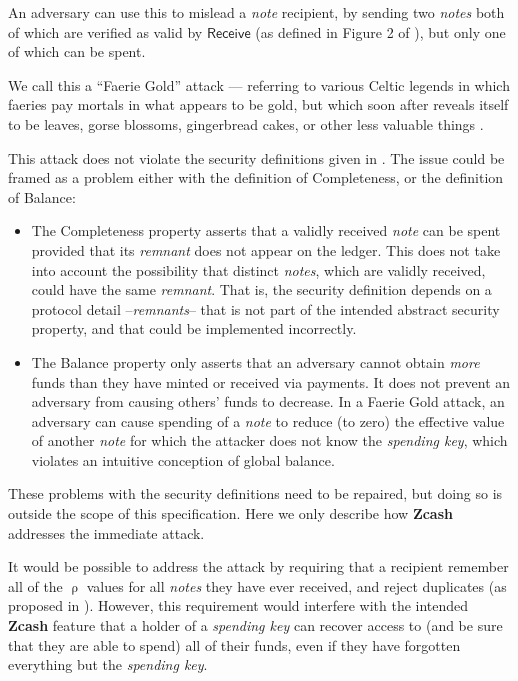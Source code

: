 \documentclass{article}
\newcommand{\term}[1]{\textsl{#1}\xspace}
\newcommand{\termbf}[1]{\textbf{#1}\xspace}
\newcommand{\Zcash}{\termbf{Zcash}}
\newcommand{\coin}{\term{note}}
\newcommand{\coins}{\term{notes}}
\newcommand{\serialNumber}{\term{remnant}}
\newcommand{\serialNumbers}{\term{remnants}}
\newcommand{\spendingKey}{\term{spending key}}
\newcommand{\CoinAddressRand}{\mathsf{\uprho}}
\newcommand{\Receive}{\mathsf{Receive}}
\begin{document}
An adversary can use this to mislead a \coin recipient, by sending
two \coins both of which are verified as valid by $\Receive$ (as
defined in Figure 2 of \cite{ZerocashOakland}), but only one of
which can be spent.

We call this a ``Faerie Gold'' attack --- referring to various Celtic
legends in which faeries pay mortals in what appears to be gold,
but which soon after reveals itself to be leaves, gorse blossoms,
gingerbread cakes, or other less valuable things \cite{LG2004}.

This attack does not violate the security definitions given in
\cite{ZerocashOakland}. The issue could be framed as a problem
either with the definition of Completeness, or the definition of
Balance:

\begin{itemize}
  \item The Completeness property asserts that a validly received
\coin can be spent provided that its \serialNumber does not appear
on the ledger. This does not take into account the possibility
that distinct \coins, which are validly received, could have the
same \serialNumber. That is, the security definition depends on
a protocol detail --\serialNumbers-- that is not part of the
intended abstract security property, and that could be implemented
incorrectly.
  \item The Balance property only asserts that an adversary cannot
obtain \emph{more} funds than they have minted or received via
payments. It does not prevent an adversary from causing others'
funds to decrease. In a Faerie Gold attack, an adversary can cause
spending of a \coin to reduce (to zero) the effective value of another
\coin for which the attacker does not know the \spendingKey, which
violates an intuitive conception of global balance.
\end{itemize}

These problems with the security definitions need to be repaired,
but doing so is outside the scope of this specification. Here we
only describe how \Zcash addresses the immediate attack.

It would be possible to address the attack by requiring that a
recipient remember all of the $\CoinAddressRand$ values for all
\coins they have ever received, and reject duplicates (as proposed
in \cite{GGM2016}). However, this requirement would interfere
with the intended \Zcash feature that a holder of a \spendingKey
can recover access to (and be sure that they are able to spend) all
of their funds, even if they have forgotten everything but the
\spendingKey.
\end{document}
